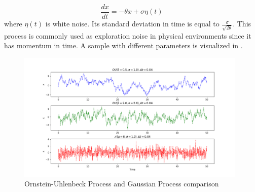 \begin{equation}
\label{eqn:ou_process}
\frac{dx}{dt} = -\theta x + \sigma \eta(t)
\end{equation}
where $\eta(t)$ is white noise. Its standard deviation in time is equal to $\frac{\sigma}{\sqrt{2\theta}}$. This process is commonly used as exploration noise in physical environments since it has momentum in time. A sample with different parameters is visualized in .
\begin{figure}
	\centering
	\includegraphics[width=0.98\textwidth]{figures/others/random_processes.png}
	\caption{Ornstein-Uhlenbeck Process and Gaussian Process comparison}
	\label{fig:ou_vs_gaussian}
\end{figure}
%
